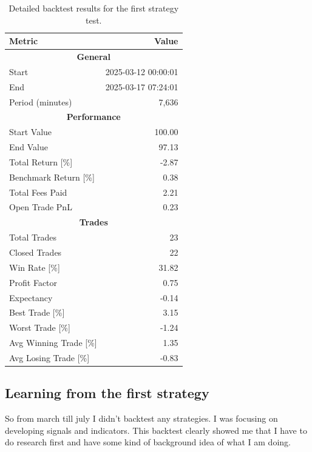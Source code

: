 \documentclass[12pt]{article}
\begin{document}
\begin{table}[H]
  \centering
  \caption{Detailed backtest results for the first strategy test.}
  \label{tab:strategy_1_detailed_results}
  \small
  \begin{tabular}{@{}lr@{}}
    \toprule
    \textbf{Metric} & \textbf{Value} \\
    \midrule
    \multicolumn{2}{c}{\textbf{General}} \\
    \midrule
    Start                         & 2025-03-12 00:00:01 \\
    End                           & 2025-03-17 07:24:01 \\
    Period (minutes)              & 7,636 \\
    \midrule
    \multicolumn{2}{c}{\textbf{Performance}} \\
    \midrule
    Start Value                   & 100.00 \\
    End Value                     & 97.13 \\
    Total Return [\%]             & -2.87 \\
    Benchmark Return [\%]         & 0.38 \\
    Total Fees Paid               & 2.21 \\
    Open Trade PnL                & 0.23 \\
    \midrule
    
    

    \multicolumn{2}{c}{\textbf{Trades}} \\
    \midrule
    Total Trades                  & 23 \\
    Closed Trades                 & 22 \\
    Win Rate [\%]                 & 31.82 \\
    Profit Factor                 & 0.75 \\
    Expectancy                    & -0.14 \\
    Best Trade [\%]               & 3.15 \\
    Worst Trade [\%]              & -1.24 \\
    Avg Winning Trade [\%]        & 1.35 \\
    Avg Losing Trade [\%]         & -0.83 \\
    
    \bottomrule
  \end{tabular}
\end{table}

\subsection{Learning from the first strategy}
So from march till july I didn't backtest any strategies. I was focusing on developing signals and indicators. This backtest clearly showed me that I have to do research first and have some kind of background idea of what I am doing.
\end{document}
